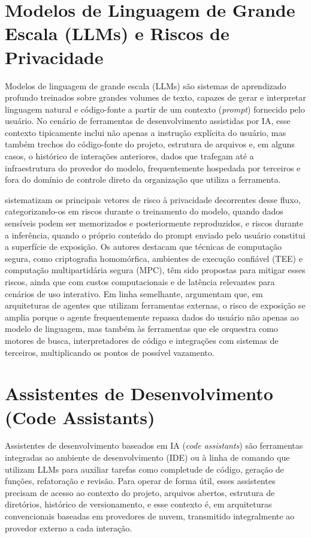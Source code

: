 \section{Modelos de Linguagem de Grande Escala (LLMs) e Riscos de Privacidade}

Modelos de linguagem de grande escala (LLMs) são sistemas de aprendizado profundo treinados sobre grandes volumes de texto, capazes de gerar e interpretar linguagem natural e código-fonte a partir de um contexto (\textit{prompt}) fornecido pelo usuário. No cenário de ferramentas de desenvolvimento assistidas por IA, esse contexto tipicamente inclui não apenas a instrução explícita do usuário, mas também trechos do código-fonte do projeto, estrutura de arquivos e, em alguns casos, o histórico de interações anteriores, dados que trafegam até a infraestrutura do provedor do modelo, frequentemente hospedada por terceiros e fora do domínio de controle direto da organização que utiliza a ferramenta.

 sistematizam os principais vetores de risco à privacidade decorrentes desse fluxo, categorizando-os em riscos durante o treinamento do modelo, quando dados sensíveis podem ser memorizados e posteriormente reproduzidos, e riscos durante a inferência, quando o próprio conteúdo do prompt enviado pelo usuário constitui a superfície de exposição. Os autores destacam que técnicas de computação segura, como criptografia homomórfica, ambientes de execução confiável (TEE) e computação multipartidária segura (MPC), têm sido propostas para mitigar esses riscos, ainda que com custos computacionais e de latência relevantes para cenários de uso interativo. Em linha semelhante,  argumentam que, em arquiteturas de agentes que utilizam ferramentas externas, o risco de exposição se amplia porque o agente frequentemente repassa dados do usuário não apenas ao modelo de linguagem, mas também às ferramentas que ele orquestra como motores de busca, interpretadores de código e integrações com sistemas de terceiros, multiplicando os pontos de possível vazamento.

\section{Assistentes de Desenvolvimento (Code Assistants)}

Assistentes de desenvolvimento baseados em IA (\textit{code assistants}) são ferramentas integradas ao ambiente de desenvolvimento (IDE) ou à linha de comando que utilizam LLMs para auxiliar tarefas como completude de código, geração de funções, refatoração e revisão. Para operar de forma útil, esses assistentes precisam de acesso ao contexto do projeto, arquivos abertos, estrutura de diretórios, histórico de versionamento, e esse contexto é, em arquiteturas convencionais baseadas em provedores de nuvem, transmitido integralmente ao provedor externo a cada interação.

